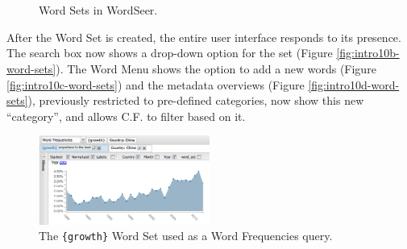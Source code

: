 \documentclass{sig-alternate}
\newcommand{\code}[1] {\texttt{#1}}
\begin{document}
\begin{figure}[ht!]
\begin{center}
%
        \\
         \\
        \quad
%
    \end{center}
    \caption{%
       Word Sets in WordSeer. \label{fig:intro10-word-sets}
     }%
\end{figure}
After the Word Set is created, the entire user interface responds to its presence. The search box now shows a drop-down option for the set  (Figure \ref{fig:intro10b-word-sets}).  The Word Menu shows the option to add a new words (Figure \ref{fig:intro10c-word-sets}) and the metadata overviews (Figure \ref{fig:intro10d-word-sets}), previously restricted to pre-defined categories,  now show this new ``category'', and allows C.F. to filter based on it.   

\begin{figure}[ht!]
\begin{center}
	\includegraphics[width=0.5\textwidth]{fig/chris/04a.png}
\end{center}
    \caption{%
	The \code{\{growth\}} Word Set used as a Word Frequencies query.\label{fig:chris04a}
     }%
\end{figure}
\end{document}
